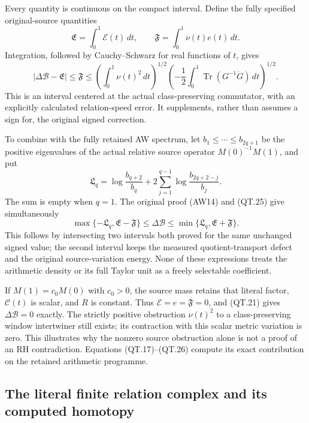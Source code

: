 Every quantity is continuous on the compact interval. Define the
fully specified original-source quantities
\[
 \mathfrak E=\int_0^1\mathcal E(t)\,dt,\qquad
 \mathfrak F=\int_0^1\nu(t)e(t)\,dt.
 \]
Integration, followed by Cauchy--Schwarz for real functions of \(t\),
gives
\[
 \boxed{\quad
 |\Delta\mathcal B-\mathfrak E|\le\mathfrak F
 \le
 \left(\int_0^1\nu(t)^2\,dt\right)^{1/2}
 \left(-\frac12\int_0^1\operatorname{Tr}(G^{-1}\ddot G)\,dt\right)^{1/2}.
 \quad}
 \tag{QT.25}\label{CFStage:eq:qt-globalbound}
\]
This is an interval centered at the actual class-preserving
commutator, with an explicitly calculated relation-speed error.
It supplements, rather than assumes a sign for, the original
signed correction.

To combine with the fully retained AW spectrum, let
\(b_1\le\cdots\le b_{2q+1}\) be the positive eigenvalues of the actual
relative source operator \(M(0)^{-1}M(1)\), and put
\[
 \mathfrak L_q=
 \log\frac{b_{q+2}}{b_q}
       +2\sum_{j=1}^{q-1}\log\frac{b_{2q+2-j}}{b_j}.
 \]
The sum is empty when \(q=1\).
The original proof (AW14) and (QT.25) give simultaneously
\[
 \boxed{\quad
 \max\{-\mathfrak L_q,\mathfrak E-\mathfrak F\}
 \le\Delta\mathcal B\le
 \min\{\mathfrak L_q,\mathfrak E+\mathfrak F\}.
 \quad}
 \tag{QT.26}\label{CFStage:eq:qt-intersection}
\]
This follows by intersecting two intervals both proved for the same
unchanged signed value; the second interval keeps the measured
quotient-transport defect and the original source-variation energy.
None of these expressions treats the arithmetic density or its full
Taylor unit as a freely selectable coefficient.

If \(M(1)=c_0M(0)\) with \(c_0>0\), the source mass retains that
literal factor, \(\mathcal C(t)\) is scalar, and \(R\) is constant.
Thus \(\mathcal E=e=\mathfrak F=0\), and (QT.21) gives
\(\Delta\mathcal B=0\) exactly. The strictly positive obstruction
\(\nu(t)^2\) to a class-preserving window intertwiner still exists;
its contraction with this scalar metric variation is zero.
This illustrates why the nonzero source obstruction alone is not
a proof of an RH contradiction. Equations (QT.17)--(QT.26) compute
its exact contribution on the retained arithmetic programme.

\subsection{The literal finite relation complex and its computed homotopy}

